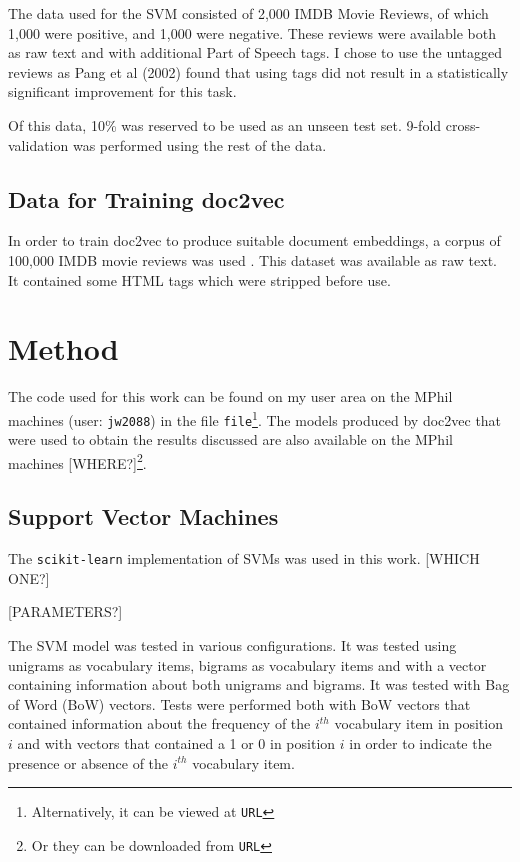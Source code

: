 \documentclass[twocolumn]{article}
\begin{document}
The data used for the SVM consisted of 2,000 IMDB Movie Reviews, of which 1,000 were positive, and 1,000 were negative. These reviews were available both as raw text and with additional Part of Speech tags. I chose to use the untagged reviews as Pang et al (2002) \cite{pang} found that using tags did not result in a statistically significant improvement for this task.

Of this data, 10\% was reserved to be used as an unseen test set. 9-fold cross-validation was performed using the rest of the data.

\subsection{Data for Training doc2vec}

In order to train doc2vec to produce suitable document embeddings, a corpus of 100,000 IMDB movie reviews was used \cite{bigimdb}. This dataset was available as raw text. It contained some HTML tags which were stripped before use.

\section{Method}

The code used for this work can be found on my user area on the MPhil machines (user: \texttt{jw2088}) in the file \texttt{file}\footnote{Alternatively, it can be viewed at \texttt{{URL}}}. The models produced by doc2vec that were used to obtain the results discussed are also available on the MPhil machines [WHERE?]\footnote{Or they can be downloaded from \texttt{{URL}}}. 

\subsection{Support Vector Machines}

The \texttt{scikit-learn}\cite{scikit-learn} implementation of SVMs was used in this work. [WHICH ONE?]

[PARAMETERS?]

The SVM model was tested in various configurations. It was tested using unigrams as vocabulary items, bigrams as vocabulary items and with a vector containing information about both unigrams and bigrams. It was tested with Bag of Word (BoW) vectors. Tests were performed both with BoW vectors that contained information about the frequency of the $i^{th}$ vocabulary item in position $i$ and with vectors that contained a 1 or 0 in position $i$ in order to indicate the presence or absence of the $i^{th}$ vocabulary item. 
\end{document}
